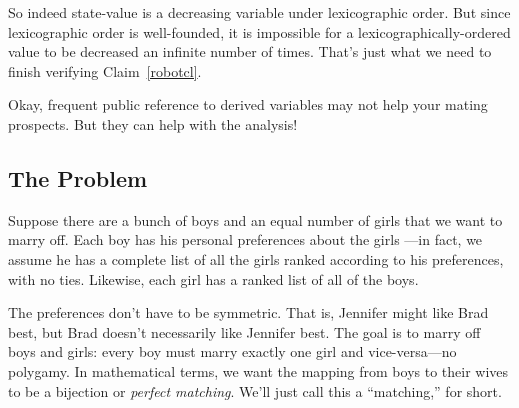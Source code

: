 So indeed state-value is a decreasing variable under lexicographic order.
But since lexicographic order is well-founded, it is impossible for a
lexicographically-ordered value to be decreased an infinite number of
times.  That's just what we need to finish verifying Claim~\ref{robotcl}.
\fi

\begin{problems}
\homeworkproblems








\classproblems







\end{problems}

\label{stablemarriagesec}

Okay, frequent public reference to derived variables may not help your
mating prospects.  But they can help with the analysis!

\subsection{The Problem}

Suppose there are a bunch of boys and an equal number of girls that we
want to marry off.  Each boy has his personal preferences about the girls
---in fact, we assume he has a complete list of all the girls ranked
according to his preferences, with no ties.  Likewise, each girl has a
ranked list of all of the boys.

The preferences don't have to be symmetric.  That is, Jennifer might like
Brad best, but Brad doesn't necessarily like Jennifer best.  The goal is
to marry off boys and girls: every boy must marry exactly one girl and
vice-versa---no polygamy.  In mathematical terms, we want the mapping
from boys to their wives to be a bijection or \emph{perfect matching}.
We'll just call this a ``matching,'' for short.

